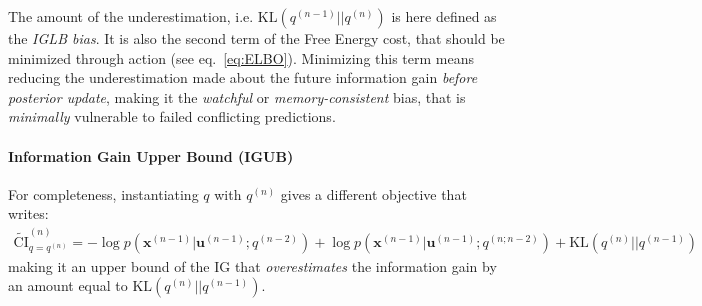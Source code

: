 \documentclass[12pt,twoside,openright]{article}
\begin{document}
{\color{Purple} The amount of the} underestimation, {\color{Purple} i.e. $\text{KL} (q^{(n-1)}||q^{(n)})$} is {\color{Purple} here defined as the \emph{IGLB bias}. It is} also the second term of the Free Energy cost, that should be minimized through action (see eq.~\ref{eq:ELBO}). Minimizing this term means reducing the underestimation made about the future information gain \emph{before posterior update}, making it the \emph{watchful} or \emph{memory-consistent} bias, that is \emph{minimally} vulnerable to failed conflicting predictions.



\paragraph{Information Gain Upper Bound (IGUB)}
{\color{Purple}For completeness, } instantiating $q$ with $q^{(n)}$ gives a different objective  that writes:
\begin{align}
\tilde{\text{CI}}^{(n)}_{q = q^{(n)}} = 
-\log p(\boldsymbol{x}^{(n-1)}|\boldsymbol{u}^{(n-1)}; q^{(n-2)}) 
+ \log p(\boldsymbol{x}^{(n-1)}|\boldsymbol{u}^{(n-1)}; q^{(n;n-2)}) + \text{KL} (q^{(n)}||q^{(n-1)})
\end{align}
making it {\color{Purple} an upper bound of the IG that} \emph{overestimates} the information gain by an amount equal to $\text{KL} (q^{(n)}||q^{(n-1)})$. 
\end{document}
